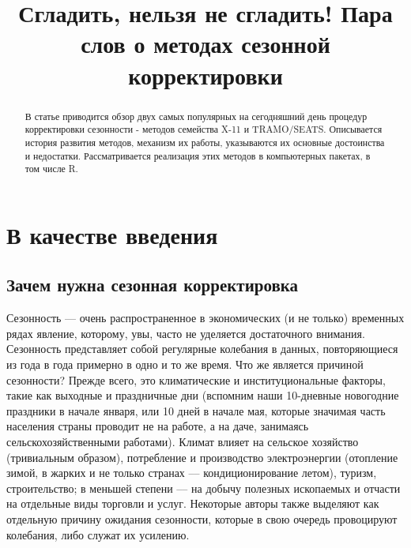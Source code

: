 \documentclass[final,pdftex]{../../template/epsilonj}\usepackage[]{graphicx}\usepackage[]{color}
\begin{document}
\begin{frontmatter}
\title{Сгладить, нельзя не сгладить! Пара слов о методах сезонной корректировки}

\begin{aug}
\author{ }%


\address{НИУ ВШЭ, Москва.}
\end{aug}

\begin{abstract}
В статье приводится обзор двух самых популярных на сегодняшний день процедур корректировки сезонности - методов семейства X-11 и TRAMO/SEATS. Описывается история развития методов, механизм их работы, указываются их основные достоинства и недостатки. Рассматривается реализация этих методов в компьютерных пакетах, в том числе R. 
\end{abstract}

\begin{keyword}
\end{keyword}

\end{frontmatter}


\section{В качестве введения}
\subsection{Зачем нужна сезонная корректировка}

Сезонность --- очень распространенное в экономических (и не только) временных рядах явление, которому, увы, часто не уделяется достаточного внимания. Сезонность представляет собой регулярные колебания в данных, повторяющиеся из года в года примерно в одно и то же время. Что же является причиной сезонности? Прежде всего, это климатические и институциональные факторы, такие как выходные и праздничные дни (вспомним наши 10-дневные новогодние праздники в начале января, или 10 дней в начале мая, которые значимая часть населения страны проводит не на работе, а на даче, занимаясь сельскохозяйственными работами). Климат влияет на сельское хозяйство (тривиальным образом), потребление и производство электроэнергии (отопление зимой, в жарких и не только странах –-- кондиционирование летом), туризм, строительство; в меньшей степени –-- на добычу полезных ископаемых и отчасти на отдельные виды торговли и услуг. Некоторые авторы также выделяют как отдельную причину ожидания сезонности, которые в свою очередь провоцируют колебания, либо служат их усилению. 
\end{document}
